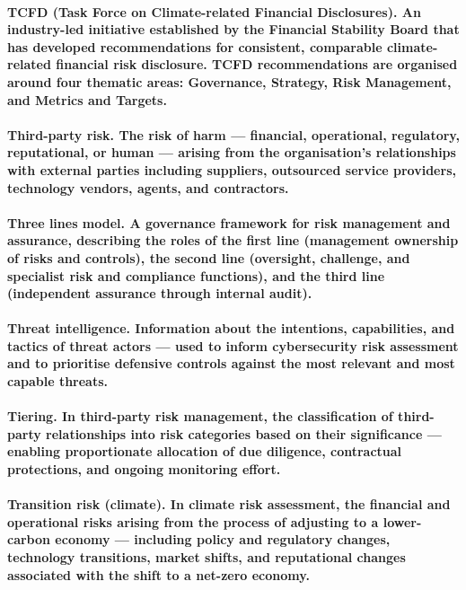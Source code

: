\paragraph{\textbf{TCFD (Task Force on Climate-related Financial Disclosures)}. An industry-led initiative established by the Financial Stability Board that has developed recommendations for consistent, comparable climate-related financial risk disclosure. TCFD recommendations are organised around four thematic areas: Governance, Strategy, Risk Management, and Metrics and Targets.}

\paragraph{\textbf{Third-party risk}. The risk of harm — financial, operational, regulatory, reputational, or human — arising from the organisation's relationships with external parties including suppliers, outsourced service providers, technology vendors, agents, and contractors.}

\paragraph{\textbf{Three lines model}. A governance framework for risk management and assurance, describing the roles of the first line (management ownership of risks and controls), the second line (oversight, challenge, and specialist risk and compliance functions), and the third line (independent assurance through internal audit).}

\paragraph{\textbf{Threat intelligence}. Information about the intentions, capabilities, and tactics of threat actors — used to inform cybersecurity risk assessment and to prioritise defensive controls against the most relevant and most capable threats.}

\paragraph{\textbf{Tiering}. In third-party risk management, the classification of third-party relationships into risk categories based on their significance — enabling proportionate allocation of due diligence, contractual protections, and ongoing monitoring effort.}

\paragraph{\textbf{Transition risk (climate)}. In climate risk assessment, the financial and operational risks arising from the process of adjusting to a lower-carbon economy — including policy and regulatory changes, technology transitions, market shifts, and reputational changes associated with the shift to a net-zero economy.}

